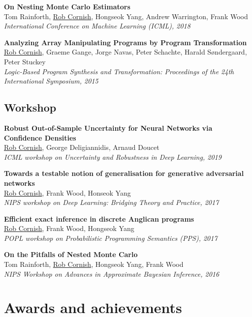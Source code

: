 \documentclass[12pt,a4paper]{article}
\begin{document}
\noindent
\textbf{On Nesting Monte Carlo Estimators} \\
Tom Rainforth, \underline{Rob Cornish}, Hongseok Yang, Andrew Warrington, Frank Wood \\
\textit{International Conference on Machine Learning (ICML), 2018}

\noindent
\textbf{Analyzing Array Manipulating Programs by Program Transformation} \\
\underline{Rob Cornish}, Graeme Gange, Jorge Navas, Peter Schachte, Harald S\o ndergaard, Peter Stuckey \\
\textit{Logic-Based Program Synthesis and Transformation: Proceedings of the 24th International Symposium, 2015}


\subsection*{Workshop}

\textbf{Robust Out-of-Sample Uncertainty for Neural Networks via Confidence Densities} \\
\underline{Rob Cornish}, George Deligiannidis, Arnaud Doucet \\
\textit{ICML workshop on Uncertainty and Robustness in Deep Learning, 2019}

\noindent
\textbf{Towards a testable notion of generalisation for generative adversarial networks} \\
\underline{Rob Cornish}, Frank Wood, Honseok Yang \\
\textit{NIPS workshop on Deep Learning: Bridging Theory and Practice, 2017}

\noindent
\textbf{Efficient exact inference in discrete Anglican programs} \\
\underline{Rob Cornish}, Frank Wood, Hongseok Yang \\
\textit{POPL workshop on Probabilistic Programming Semantics (PPS), 2017}

\noindent
\textbf{On the Pitfalls of Nested Monte Carlo} \\
Tom Rainforth, \underline{Rob Cornish}, Hongseok Yang, Frank Wood \\
\textit{NIPS Workshop on Advances in Approximate Bayesian Inference, 2016}

\section*{Awards and achievements}
\end{document}
